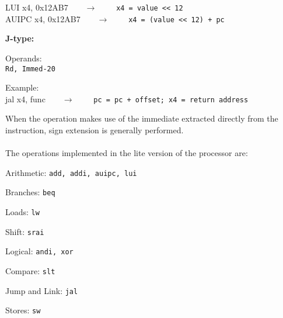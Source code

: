 \begin{description}
\begin{description}
		\textsf{LUI x4, 0x12AB7}\ \ \ \ $\longrightarrow$ \ \ \ \ \texttt{x4 = value << 12}\\
		\textsf{AUIPC x4, 0x12AB7}\ \ \ \ $\longrightarrow$ \ \ \ \ \texttt{x4 = (value << 12) + pc}
	\end{description}
	\item \textbf{J-type:}
	\begin{description}
		\item Operands:\\
		\texttt{Rd, Immed-20}
		\item Example:\\
		\textsf{jal x4, func}\ \ \ \ $\longrightarrow$ \ \ \ \ \texttt{pc = pc + offset; x4 = return address}
	\end{description}
\end{description}
When the operation makes use of the immediate extracted directly from the instruction, sign extension is generally performed.\\ \\
The operations implemented in the lite version of the processor are:
\begin{description}
	\item Arithmetic:
	\texttt{add, addi, auipc, lui}
	\item Branches:
	\texttt{beq}
	\item Loads:
	\texttt{lw}
	\item Shift:
	\texttt{srai}
	\item Logical:
	\texttt{andi, xor}
	\item Compare:
	\texttt{slt}
	\item Jump and Link:
	\texttt{jal}
	\item Stores:
	\texttt{sw}
\end{description}

